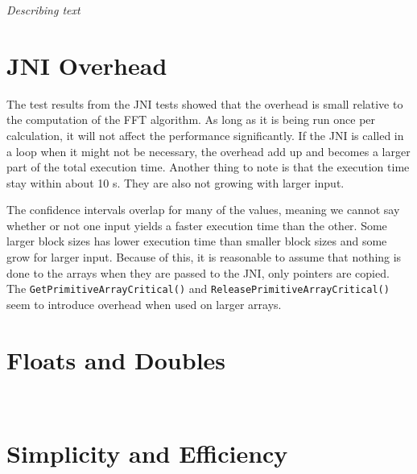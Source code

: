 \textit{Describing text}

\section{JNI Overhead}
The test results from the JNI tests showed that the overhead is small relative to the computation of the FFT algorithm. As long as it is being run once per calculation, it will not affect the performance significantly. If the JNI is called in a loop when it might not be necessary, the overhead add up and becomes a larger part of the total execution time. Another thing to note is that the execution time stay within about 10 \textmu s. They are also not growing with larger input.

The confidence intervals overlap for many of the values, meaning we cannot say whether or not one input yields a faster execution time than the other. Some larger block sizes has lower execution time than smaller block sizes and some grow for larger input. Because of this, it is reasonable to assume that nothing is done to the arrays when they are passed to the JNI, only pointers are copied. The \texttt{GetPrimitiveArrayCritical()} and \texttt{ReleasePrimitiveArrayCritical()} seem to introduce overhead when used on larger arrays. %



\section{Floats and Doubles}

\\

\section{Simplicity and Efficiency} %



